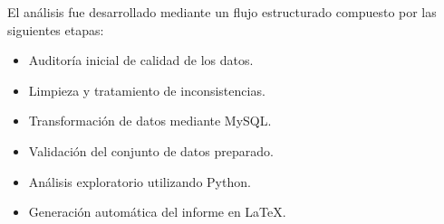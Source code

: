 















El análisis fue desarrollado mediante un flujo estructurado compuesto por las siguientes etapas:

\vspace{0.3cm}

\begin{itemize}[leftmargin=1.2cm]

\item[\color{ReportGold}$\blacktriangleright$]
Auditoría inicial de calidad de los datos.

\item[\color{ReportGold}$\blacktriangleright$]
Limpieza y tratamiento de inconsistencias.

\item[\color{ReportGold}$\blacktriangleright$]
Transformación de datos mediante MySQL.

\item[\color{ReportGold}$\blacktriangleright$]
Validación del conjunto de datos preparado.

\item[\color{ReportGold}$\blacktriangleright$]
Análisis exploratorio utilizando Python.

\item[\color{ReportGold}$\blacktriangleright$]
Generación automática del informe en \LaTeX.

\end{itemize}


\vspace{0.8cm}

